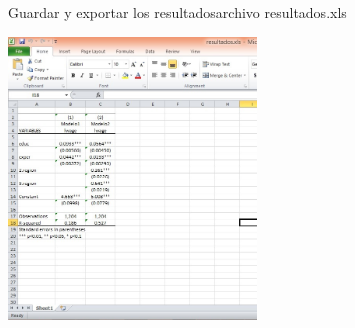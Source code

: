 \documentclass{beamer}
\begin{document}
\begin{frame}{Guardar y exportar los resultados}{archivo resultados.xls}
\centerline{\includegraphics[height=7.5cm]{out.jpg}}
\end{frame}
\end{document}
